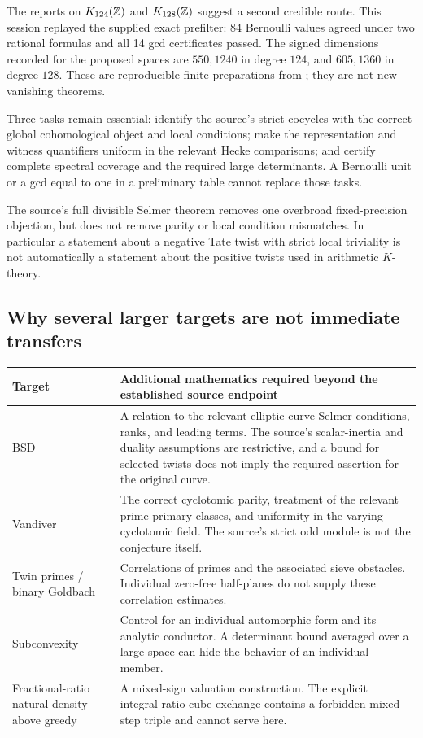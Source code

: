 The reports on $K_{124}(\mathbb Z)$ and $K_{128}(\mathbb Z)$ suggest a second
credible route. This session replayed the supplied exact prefilter:
84 Bernoulli values agreed under two rational formulas and all 14
gcd certificates passed. The signed dimensions recorded for the
proposed spaces are $550,1240$ in degree $124$, and $605,1360$ in
degree $128$. These are reproducible finite preparations from
\cite{prior-ktheory}; they are not new vanishing theorems.

Three tasks remain essential: identify the source's strict cocycles
with the correct global cohomological object and local conditions;
make the representation and witness quantifiers uniform in the
relevant Hecke comparisons; and certify complete spectral coverage
and the required large determinants. A Bernoulli unit or a gcd equal
to one in a preliminary table cannot replace those tasks.

The source's full divisible Selmer theorem removes one overbroad
fixed-precision objection, but does not remove parity or local
condition mismatches. In particular a statement about a negative
Tate twist with strict local triviality is not automatically a
statement about the positive twists used in arithmetic $K$-theory.

\subsection{Why several larger targets are not immediate transfers}

\begin{center}\small
\begin{tabularx}{\textwidth}{@{}>{\raggedright\arraybackslash}p{}Y@{}}
\toprule
Target & Additional mathematics required beyond the established source endpoint\\
\midrule
BSD & A relation to the relevant elliptic-curve Selmer conditions,
ranks, and leading terms. The source's scalar-inertia and duality
assumptions are restrictive, and a bound for selected twists does
not imply the required assertion for the original curve.\\
Vandiver & The correct cyclotomic parity, treatment of the relevant
prime-primary classes, and uniformity in the varying cyclotomic
field. The source's strict odd module is not the conjecture itself.\\
Twin primes / binary Goldbach & Correlations of primes and the
associated sieve obstacles. Individual zero-free half-planes do not
supply these correlation estimates.\\
Subconvexity & Control for an individual automorphic form and its
analytic conductor. A determinant bound averaged over a large space
can hide the behavior of an individual member.\\
Fractional-ratio natural density above greedy & A mixed-sign
valuation construction. The explicit integral-ratio cube exchange
contains a forbidden mixed-step triple and cannot serve here.\\
\bottomrule
\end{tabularx}
\end{center}

